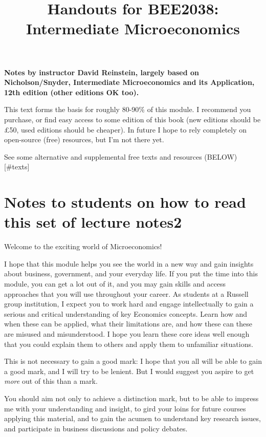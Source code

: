 \documentclass[]{article}
\title{Handouts for BEE2038: Intermediate Microeconomics}
\date{}
\begin{document}
\maketitle

{
\hypersetup{linkcolor=black}
\setcounter{tocdepth}{1}
\tableofcontents
}
\textbf{Notes by instructor David Reinstein, largely based on
Nicholson/Snyder, Intermediate Microeconomics and its Application, 12th
edition (other editions OK too).}

This text forms the basis for roughly 80-90\% of this module. I
recommend you purchase, or find easy access to some edition of this book
(new editions should be £50, used editions should be cheaper). In future
I hope to rely completely on open-source (free) resources, but I'm not
there yet.

See some alternative and supplemental free texts and resources
(BELOW){[}\#texts{]}

\hypertarget{notes-to-students-on-how-to-read-this-set-of-lecture-notes2}{%
\section{Notes to students on how to read this set of lecture
notes2}\label{notes-to-students-on-how-to-read-this-set-of-lecture-notes2}}

Welcome to the exciting world of Microeconomics!

I hope that this module helps you see the world in a new way and gain
insights about business, government, and your everyday life. If you put
the time into this module, you can get a lot out of it, and you may gain
skills and access approaches that you will use throughout your career.
As students at a Russell group institution, I expect you to work hard
and engage intellectually to gain a serious and critical understanding
of key Economics concepts. Learn how and when these can be applied, what
their limitations are, and how these can these are misused and
misunderstood. I hope you learn these core ideas well enough that you
could explain them to others and apply them to unfamiliar situations.

This is not necessary to gain a good mark: I hope that you all will be
able to gain a good mark, and I will try to be lenient. But I would
suggest you aspire to get \emph{more} out of this than a mark.

You should aim not only to achieve a distinction mark, but to be able to
impress me with your understanding and insight, to gird your loins for
future courses applying this material, and to gain the acumen to
understand key research issues, and participate in business discussions
and policy debates.
\end{document}
